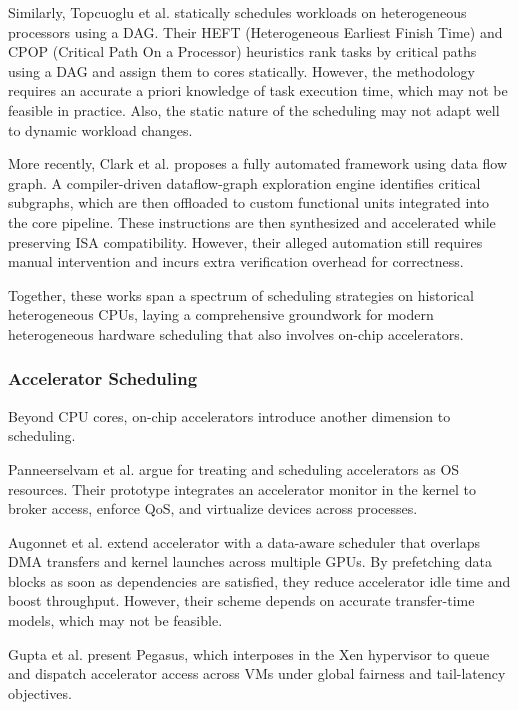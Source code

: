 Similarly, Topcuoglu et al. \cite{topcuogluTaskScheduling1999} statically schedules workloads on heterogeneous processors using a DAG.
Their HEFT (Heterogeneous Earliest Finish Time) and CPOP (Critical Path On a Processor) heuristics rank tasks by critical paths using a DAG and assign them to cores statically.
However, the methodology requires an accurate a priori knowledge of task execution time, which may not be feasible in practice.
Also, the static nature of the scheduling may not adapt well to dynamic workload changes.

More recently, Clark et al. \cite{clarkProcessorAcceleration2003} proposes a fully automated framework using data flow graph.
A compiler-driven dataflow-graph exploration engine identifies critical subgraphs, which are then offloaded to custom functional units integrated into the core pipeline.
These instructions are then synthesized and accelerated while preserving ISA compatibility.
However, their alleged automation still requires manual intervention and incurs extra verification overhead for correctness.

Together, these works span a spectrum of scheduling strategies on historical heterogeneous CPUs, laying a comprehensive groundwork for modern heterogeneous hardware scheduling that also involves on-chip accelerators.

\subsubsection{Accelerator Scheduling}

Beyond CPU cores, on-chip accelerators introduce another dimension to scheduling.

Panneerselvam et al. \cite{panneerselvamOperatingSystems2012} argue for treating and scheduling accelerators as OS resources.
Their prototype integrates an accelerator monitor in the kernel to broker access, enforce QoS, and virtualize devices across processes.

Augonnet et al. \cite{augonnetDataAwareTask2010} extend accelerator with a data-aware scheduler that overlaps DMA transfers and kernel launches across multiple GPUs.
By prefetching data blocks as soon as dependencies are satisfied, they reduce accelerator idle time and boost throughput.
However, their scheme depends on accurate transfer-time models, which may not be feasible.

Gupta et al. \cite{guptaPegasusCoordinated2011} present Pegasus, which interposes in the Xen hypervisor to queue and dispatch accelerator access across VMs under global fairness and tail-latency objectives.

